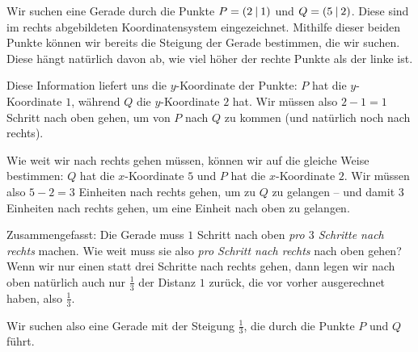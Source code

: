 \documentclass[../../main.tex]{subfiles}
\begin{document}
\begin{example}{}
    Wir suchen eine Gerade durch die Punkte $P=\left(2 \:\middle|\: 1\right)$ und $Q=\left(5 \:\middle|\: 2\right)$. Diese sind im rechts abgebildeten Koordinatensystem eingezeichnet. Mithilfe dieser beiden Punkte können wir bereits die Steigung der Gerade bestimmen, die wir suchen. Diese hängt natürlich davon ab, wie viel höher der rechte Punkte als der linke ist.

    Diese Information liefert uns die $y$-Koordinate der Punkte: $P$ hat die $y$-Koordinate $1$, während $Q$ die $y$-Koordinate $2$ hat. Wir müssen also $2-1=1$ Schritt nach oben gehen, um von $P$ nach $Q$ zu kommen (und natürlich noch nach rechts).

    Wie weit wir nach rechts gehen müssen, können wir auf die gleiche Weise bestimmen: $Q$ hat die $x$-Koordinate $5$ und $P$ hat die $x$-Koordinate $2$. Wir müssen also $5-2=3$ Einheiten nach rechts gehen, um zu $Q$ zu gelangen -- und damit $3$ Einheiten nach rechts gehen, um eine Einheit nach oben zu gelangen.

    Zusammengefasst: Die Gerade muss $1$ Schritt nach oben \emph{pro $3$ Schritte nach rechts} machen. Wie weit muss sie also \emph{pro Schritt nach rechts} nach oben gehen? Wenn wir nur einen statt drei Schritte nach rechts gehen, dann legen wir nach oben natürlich auch nur $\frac{1}{3}$ der Distanz $1$ zurück, die vor vorher ausgerechnet haben, also $\frac{1}{3}$.

    Wir suchen also eine Gerade mit der Steigung $\frac{1}{3}$, die durch die Punkte $P$ und $Q$ führt.
\end{example}
\end{document}
